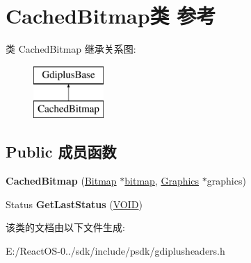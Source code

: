 \hypertarget{class_cached_bitmap}{}\section{Cached\+Bitmap类 参考}
\label{class_cached_bitmap}
类 Cached\+Bitmap 继承关系图\+:\begin{figure}[H]
\begin{center}
\leavevmode
\includegraphics[height=2.000000cm]{class_cached_bitmap}
\end{center}
\end{figure}
\subsection*{Public 成员函数}
\begin{DoxyCompactItemize}
\item 
\mbox{\label{class_cached_bitmap_ac03e78647947d29839091c65b00bf508}} 
{\bfseries Cached\+Bitmap} (\hyperlink{class_bitmap}{Bitmap} $\ast$\hyperlink{structbitmap}{bitmap}, \hyperlink{class_graphics}{Graphics} $\ast$graphics)
\item 
\mbox{\label{class_cached_bitmap_af4edf953ecc6f37cee2c4618828565fa}} 
Status {\bfseries Get\+Last\+Status} (\hyperlink{interfacevoid}{V\+O\+ID})
\end{DoxyCompactItemize}


该类的文档由以下文件生成\+:\begin{DoxyCompactItemize}
\item 
E\+:/\+React\+O\+S-\/0../sdk/include/psdk/gdiplusheaders.\+h\end{DoxyCompactItemize}
